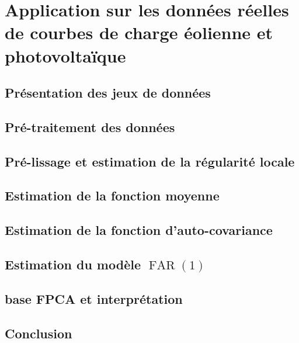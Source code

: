 \section{
  Application sur les données réelles de courbes de charge éolienne et photovoltaïque
 }

\subsection{Présentation des jeux de données}

\subsection{Pré-traitement des données}

\subsection{Pré-lissage et estimation de la régularité locale}

\subsection{Estimation de la fonction moyenne}

\subsection{Estimation de la fonction d'auto-covariance}

\subsection{Estimation du modèle $\operatorname{FAR}(1)$}

\subsection{base FPCA et interprétation}

\subsection{Conclusion}